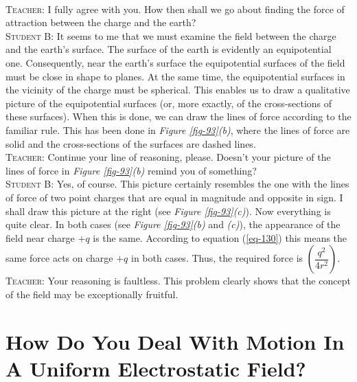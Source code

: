 \documentclass[a4paper,sfsidenotes]{tufte-book}
\begin{document}
\\
\textsc{Teacher:} I fully agree with you. How then shall we go about finding the force of attraction between the charge and the earth?
\\
\textsc{Student B:} It seems to me that we must examine the field between the charge and the earth's surface. The surface of the earth is evidently an equipotential one. Consequently, near the earth's surface the equipotential surfaces of the field must be close in shape to planes. At the same time, the equipotential surfaces in the vicinity of the charge must be spherical. This enables us to draw a qualitative picture of the equipotential surfaces (or, more exactly, of the cross-sections of these surfaces). When this is done, we can draw the lines of force according to the familiar rule. This has been done in \emph{Figure \ref{fig-93}(b)}, where the lines of force are solid and the cross-sections of the surfaces are dashed lines.
\\
\textsc{Teacher:} Continue your line of reasoning, please. Doesn't your picture of the lines of force in \emph{Figure \ref{fig-93}(b)} remind you of something?
\\
\textsc{Student B:} Yes, of course. This picture certainly resembles the one with the lines of force of two point charges that are equal in magnitude and opposite in sign. I shall draw this picture at the right (see \emph{Figure \ref{fig-93}(c)}). Now everything is quite clear. In both cases (see \emph{Figure \ref{fig-93}(b)} and \emph{(c)}), the appearance of the field near charge $+q$ is the same. According to equation (\ref{eq-130}) this means the same force acts on charge $+q$ in both cases. Thus, the required force is $\left( \dfrac{q^{2}}{4r^{2}} \right)$.
\\
\textsc{Teacher:} Your reasoning is faultless. This problem clearly shows that the concept of the field may be exceptionally fruitful.



\chapter{How Do You Deal With Motion In A Uniform Electrostatic Field?}
\label{ch-25}
\end{document}
